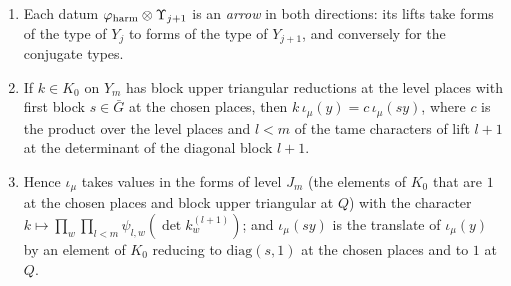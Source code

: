 \begin{proposition}\label{prop:lower-chain}
\begin{enumerate}[label=\textup{(\alph*)}]
\item Each datum $\varphi_{\rm harm}\otimes\Upsilon_{j+1}$ is an \emph{arrow} in both directions: its lifts take forms of the type
of $Y_j$ to forms of the type of $Y_{j+1}$, and conversely for the conjugate types.
\item If $k\in K_0$ on $Y_m$ has block upper triangular reductions at the level places with first block $s\in\bar G$ at the
chosen places, then $k\,\iota_\mu(y)=c\,\iota_\mu(sy)$, where $c$ is the product over the level places and $l<m$ of the
tame characters of lift $l+1$ at the determinant of the diagonal block $l+1$.
\item Hence $\iota_\mu$ takes values in the forms of level $J_m$ (the elements of $K_0$ that are $1$ at the chosen places and
block upper triangular at $Q$) with the character $k\mapsto\prod_w\prod_{l<m}\psi_{l,w}(\det k_w^{(l+1)})$; and
$\iota_\mu(sy)$ is the translate of $\iota_\mu(y)$ by an element of $K_0$ reducing to $\mathrm{diag}(s,1)$ at the chosen
places and to $1$ at $Q$.
\end{enumerate}
\end{proposition}


